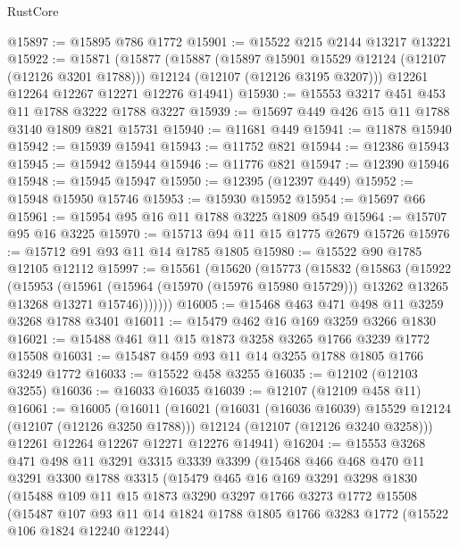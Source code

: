\begin{lexlean}{RustCore}
\begin{coremodule}
@15897 := @15895 @786 @1772
@15901 := @15522 @215 @2144 @13217 @13221
@15922 := @15871
    (@15877
      (@15887
        (@15897 @15901 @15529 @12124 (@12107 (@12126 @3201 @1788)))
        @12124
        (@12107 (@12126 @3195 @3207)))
      @12261
      @12264
      @12267
      @12271
      @12276
      @14941)
@15930 := @15553 @3217 @451 @453 @11 @1788 @3222 @1788 @3227
@15939 := @15697 @449 @426 @15 @11 @1788 @3140 @1809 @821 @15731
@15940 := @11681 @449
@15941 := @11878 @15940
@15942 := @15939 @15941
@15943 := @11752 @821
@15944 := @12386 @15943
@15945 := @15942 @15944
@15946 := @11776 @821
@15947 := @12390 @15946
@15948 := @15945 @15947
@15950 := @12395 (@12397 @449)
@15952 := @15948 @15950 @15746
@15953 := @15930 @15952
@15954 := @15697 @66
@15961 := @15954 @95 @16 @11 @1788 @3225 @1809 @549
@15964 := @15707 @95 @16 @3225
@15970 := @15713 @94 @11 @15 @1775 @2679 @15726
@15976 := @15712 @91 @93 @11 @14 @1785 @1805
@15980 := @15522 @90 @1785 @12105 @12112
@15997 := @15561
    (@15620
      (@15773
        (@15832
          (@15863
            (@15922
              (@15953
                (@15961
                  (@15964 (@15970 (@15976 @15980 @15729)))
                  @13262
                  @13265
                  @13268
                  @13271
                  @15746)))))))
@16005 := @15468 @463 @471 @498 @11 @3259 @3268 @1788 @3401
@16011 := @15479 @462 @16 @169 @3259 @3266 @1830
@16021 := @15488 @461 @11 @15 @1873 @3258 @3265 @1766 @3239 @1772 @15508
@16031 := @15487 @459 @93 @11 @14 @3255 @1788 @1805 @1766 @3249 @1772
@16033 := @15522 @458 @3255
@16035 := @12102 (@12103 @3255)
@16036 := @16033 @16035
@16039 := @12107 (@12109 @458 @11)
@16061 := @16005
    (@16011
      (@16021
        (@16031 (@16036 @16039) @15529 @12124 (@12107 (@12126 @3250 @1788)))
        @12124
        (@12107 (@12126 @3240 @3258)))
      @12261
      @12264
      @12267
      @12271
      @12276
      @14941)
@16204 := @15553
    @3268
    @471
    @498
    @11
    @3291
    @3315
    @3339
    @3399
    (@15468
      @466
      @468
      @470
      @11
      @3291
      @3300
      @1788
      @3315
      (@15479
        @465
        @16
        @169
        @3291
        @3298
        @1830
        (@15488
          @109
          @11
          @15
          @1873
          @3290
          @3297
          @1766
          @3273
          @1772
          @15508
          (@15487
            @107
            @93
            @11
            @14
            @1824
            @1788
            @1805
            @1766
            @3283
            @1772
            (@15522 @106 @1824 @12240 @12244)

\end{coremodule}
\end{lexlean}
